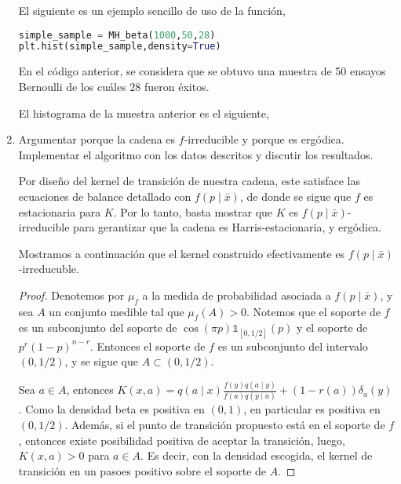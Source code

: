 \documentclass{article}
\begin{document}
\begin{enumerate}
    El siguiente es un ejemplo sencillo de uso de la función,

\begin{lstlisting}[language=Python]
simple_sample = MH_beta(1000,50,28)
plt.hist(simple_sample,density=True)\end{lstlisting}

    En el código anterior, se considera que se obtuvo una muestra de 50 ensayos Bernoulli
    de los cuáles 28 fueron éxitos.

    El histograma de la muestra anterior es el siguiente,

    \begin{center}
        
    \end{center}

    \item Argumentar porque la cadena es $f$-irreducible y porque es ergódica. 
    Implementar el algoritmo con los datos descritos y discutir los resultados.

    Por diseño del kernel de transición de nuestra cadena, este satisface las ecuaciones
    de balance detallado con $f(p\mid \bar x)$, de donde se sigue que $f$ es estacionaria
    para $K$. Por lo tanto, basta mostrar que $K$ es $f(p\mid \bar x)$-irreducible para
    gerantizar que la cadena es Harris-estacionaria, y ergódica.

    Mostramos a continuación que el kernel construido efectivamente es $f(p\mid \bar x)$-irreducuble.

    \begin{proof}
        Denotemos por $\mu_f$ a la medida de probabilidad asociada a $f(p\mid \bar x)$, y sea
        $A$ un conjunto medible tal que $\mu_f(A)>0$. 
        Notemos que el soporte de $f$ es un subconjunto del soporte de $\cos(\pi p)\mathds 1_{[0,1/2]}(p)$ 
        y el soporte de $p^r(1-p)^{n-r}$. Entonces el soporte de $f$ es un subconjunto del intervalo 
        $(0,1/2)$, y se sigue que $A \subset (0,1/2)$.

        Sea $a \in A$, entonces $K(x,a) = q(a\mid x) \frac{ f(y) q(a \mid y) }{f(a) q(y\mid a)} + (1 - r(a))\delta_{a}(y)$.
        Como la densidad beta es positiva en $(0,1)$, en particular es positiva en $(0,1/2)$. Además, si el
        punto de transición propuesto está en el soporte de $f$, entonces existe posibilidad positiva de aceptar
        la transición, luego, $K(x,a) > 0$ para $a\in A$. Es decir, con la densidad escogida, el kernel
        de transición en un pasoes positivo sobre el soporte de $A$.


\end{proof}
\end{enumerate}
\end{document}
